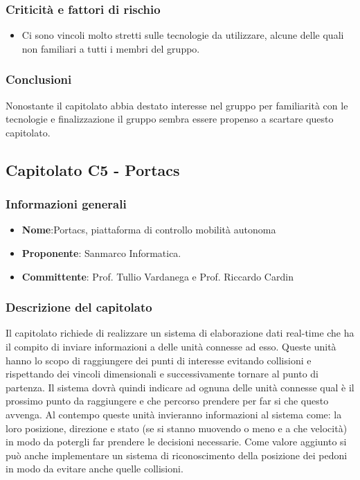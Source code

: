 		\subsubsection{Criticità e fattori di rischio}
			\begin{itemize}
				\item Ci sono vincoli molto stretti sulle tecnologie da utilizzare, alcune delle quali non familiari a tutti i membri del gruppo.
			\end{itemize}
		\subsubsection{Conclusioni}
			Nonostante il capitolato abbia destato interesse nel gruppo per familiarità con le tecnologie e finalizzazione il gruppo sembra essere propenso a scartare questo capitolato.
\newpage
				
				
			
	\subsection{Capitolato C5 - Portacs}
		\subsubsection{Informazioni generali}
			\begin{itemize}
				\item\textbf{Nome}:Portacs, piattaforma di controllo mobilità autonoma
				\item\textbf{Proponente}: Sanmarco Informatica.
				\item\textbf{Committente}: Prof. Tullio Vardanega e Prof. Riccardo Cardin
			\end{itemize}
			
		\subsubsection{Descrizione del capitolato}
			Il capitolato richiede di realizzare un sistema di elaborazione dati real-time che ha il compito di inviare informazioni a delle unità connesse ad esso. Queste unità hanno lo scopo di raggiungere dei punti di interesse evitando collisioni e rispettando dei vincoli dimensionali e successivamente tornare al punto di partenza. Il sistema dovrà quindi indicare ad ognuna delle unità connesse qual è il prossimo punto da raggiungere e che percorso prendere per far si che questo avvenga. Al contempo queste unità invieranno informazioni al sistema come: la loro posizione, direzione e stato (se si stanno muovendo o meno e a che velocità) in modo da potergli far prendere le decisioni necessarie. Come valore aggiunto si può anche implementare un sistema di riconoscimento della posizione dei pedoni in modo da evitare anche quelle collisioni. 

